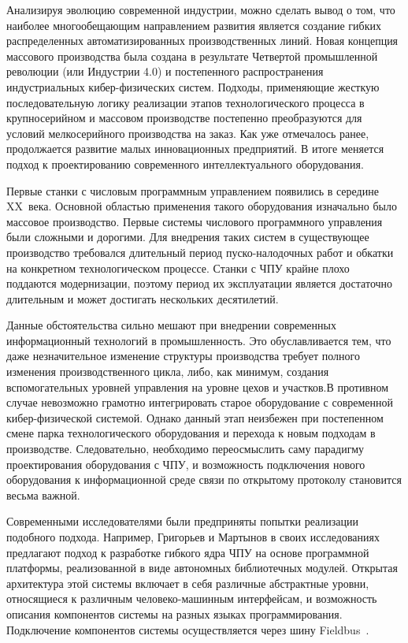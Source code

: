 Анализируя эволюцию современной индустрии, можно сделать вывод о том, что наиболее многообещающим направлением развития является создание гибких распределенных автоматизированных производственных линий. Новая концепция массового производства была создана в результате Четвертой промышленной революции (или Индустрии 4.0) и постепенного распространения индустриальных кибер-физических систем. Подходы, применяющие жесткую последовательную логику реализации этапов технологического процесса в крупносерийном и массовом производстве постепенно преобразуются для условий мелкосерийного производства на заказ. Как уже отмечалось ранее, продолжается развитие малых инновационных предприятий. В итоге меняется подход к проектированию современного интеллектуального оборудования.

Первые станки с числовым программным управлением появились в середине XX~века. Основной областью применения такого оборудования изначально было массовое производство. Первые системы числового программного управления были сложными и дорогими. Для внедрения таких систем в существующее производство требовался длительный период пуско-налодочных работ и обкатки на конкретном технологическом процессе. Станки с ЧПУ крайне плохо поддаются модернизации, поэтому период их эксплуатации является достаточно длительным и может достигать нескольких десятилетий.

Данные обстоятельства сильно мешают при внедрении современных информационный технологий в промышленность. Это обуславливается тем, что даже незначительное изменение структуры производства требует полного изменения производственного цикла, либо, как минимум, создания вспомогательных уровней управления на уровне цехов и участков.В противном случае невозможно грамотно интегрировать старое оборудование с современной кибер-физической системой. Однако данный этап неизбежен при постепенном смене парка технологического оборудования и перехода к новым подходам в производстве.
Следовательно, необходимо переосмыслить саму парадигму проектирования оборудования с ЧПУ, и возможность подключения нового оборудования к информационной среде связи по открытому протоколу становится весьма важной.

Современными исследователями были предприняты попытки реализации подобного подхода. Например, Григорьев и Мартынов в своих исследованиях предлагают подход к разработке гибкого ядра ЧПУ на основе программной платформы, реализованной в виде автономных библиотечных модулей. Открытая архитектура этой системы включает в себя различные абстрактные уровни, относящиеся к различным человеко-машинным интерфейсам, и возможность описания компонентов системы на разных языках программирования. Подключение компонентов системы осуществляется через шину Fieldbus~\cite{Grigoriev2014517}.

